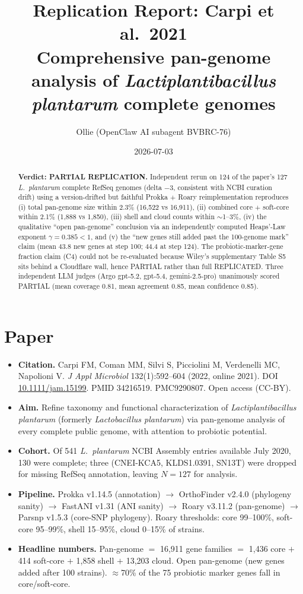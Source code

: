 \documentclass[11pt,letterpaper]{article}
\title{Replication Report: Carpi et al.\ 2021 \\
\large Comprehensive pan-genome analysis of \emph{Lactiplantibacillus plantarum} complete genomes}
\author{Ollie (OpenClaw AI subagent BVBRC-76)}
\date{2026-07-03}
\begin{document}
\maketitle

\begin{abstract}
\noindent\textbf{Verdict: PARTIAL REPLICATION.} Independent rerun on 124 of the paper's 127
\emph{L.\ plantarum} complete RefSeq genomes (delta $-3$, consistent with NCBI curation drift)
using a version-drifted but faithful Prokka $+$ Roary reimplementation reproduces
(i) total pan-genome size within 2.3\% (16{,}522 vs 16{,}911),
(ii) combined core $+$ soft-core within 2.1\% (1{,}888 vs 1{,}850),
(iii) shell and cloud counts within $\sim$1--3\%,
(iv) the qualitative ``open pan-genome'' conclusion via an independently
computed Heaps'-Law exponent $\gamma = 0.385 < 1$, and
(v) the ``new genes still added past the 100-genome mark'' claim (mean 43.8
new genes at step 100; 44.4 at step 124).
The probiotic-marker-gene fraction claim (C4) could not be re-evaluated because
Wiley's supplementary Table S5 sits behind a Cloudflare wall, hence PARTIAL rather than full REPLICATED.
Three independent LLM judges (Argo gpt-5.2, gpt-5.4, gemini-2.5-pro) unanimously
scored PARTIAL (mean coverage 0.81, mean agreement 0.85, mean confidence 0.85).
\end{abstract}

\section{Paper}

\begin{itemize}
  \item \textbf{Citation.} Carpi FM, Coman MM, Silvi S, Picciolini M, Verdenelli MC, Napolioni V.
        \emph{J Appl Microbiol} 132(1):592--604 (2022, online 2021).
        DOI \href{https://doi.org/10.1111/jam.15199}{10.1111/jam.15199}. PMID 34216519. PMC9290807. Open access (CC-BY).
  \item \textbf{Aim.} Refine taxonomy and functional characterization of \emph{Lactiplantibacillus plantarum}
        (formerly \emph{Lactobacillus plantarum}) via pan-genome analysis of every complete public genome,
        with attention to probiotic potential.
  \item \textbf{Cohort.} Of 541 \emph{L.\ plantarum} NCBI Assembly entries available July 2020,
        130 were complete; three (CNEI-KCA5, KLDS1.0391, SN13T) were dropped for missing RefSeq annotation,
        leaving $N = 127$ for analysis.
  \item \textbf{Pipeline.} Prokka v1.14.5 (annotation) $\to$ OrthoFinder v2.4.0 (phylogeny sanity)
        $\to$ FastANI v1.31 (ANI sanity) $\to$ Roary v3.11.2 (pan-genome)
        $\to$ Parsnp v1.5.3 (core-SNP phylogeny). Roary thresholds:
        core 99--100\%, soft-core 95--99\%, shell 15--95\%, cloud 0--15\% of strains.
  \item \textbf{Headline numbers.} Pan-genome $=$ 16{,}911 gene families
        $=$ 1{,}436 core $+$ 414 soft-core $+$ 1{,}858 shell $+$ 13{,}203 cloud.
        Open pan-genome (new genes added after 100 strains). $\approx$70\% of the 75 probiotic marker genes fall in core/soft-core.
\end{itemize}
\end{document}
